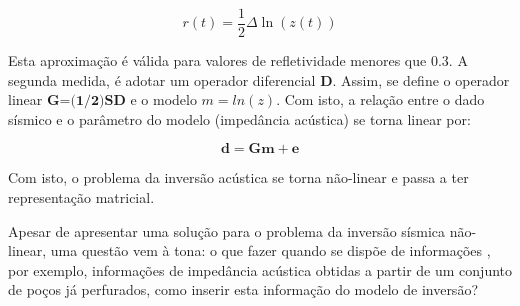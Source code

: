 \begin{equation}
r(t) = \frac{1}{2}\Delta \ln(z(t))
\label{eq:lnz}
\end{equation}

Esta aproximação é válida para valores de refletividade menores que $0.3$.
A segunda medida, é adotar um operador diferencial $\textbf{D}$. Assim,
se define o operador linear $\textbf{G=(1/2)SD}$ e o modelo $m=ln(z)$.
Com isto, a relação entre o dado sísmico e o parâmetro do modelo (impedância acústica)
se torna linear por:

\begin{equation}
\label{eq:sismDiscreta}
\mathbf{d = Gm + e}
\end{equation}

Com isto, o problema da inversão acústica se torna não-linear e passa a ter representação matricial.

Apesar de apresentar uma solução para o problema da inversão sísmica não-linear, uma questão
vem à tona: o que fazer quando se dispõe de informações , por exemplo,
informações de impedância acústica obtidas a partir de um conjunto de poços já
perfurados, como inserir esta informação do modelo de inversão?

